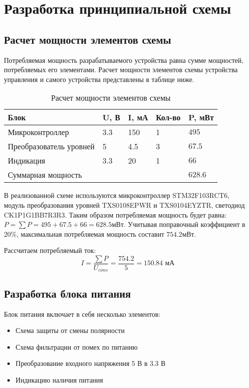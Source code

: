 \section{Разработка принципиальной схемы}
\label{sec:principal}

\subsection{Расчет мощности элементов схемы}
Потребляемая мощность разрабатываемого устройства равна сумме мощностей, потребляемых его элементами. Расчет мощности элементов схемы устройства управления и самого устройства представлены в таблице ниже.

\begin{table}[ht]
    \caption{Расчет мощности элементов схемы}
    \label{table:power_calc}
    \begin{tabular}{|llll|l|}
        \hline
        \multicolumn{1}{|l|}{Блок}                    & \multicolumn{1}{l|}{U, В} & \multicolumn{1}{l|}{I, мА} & Кол-во & P, мВт  \\ \hline
        \multicolumn{1}{|l|}{Микроконтроллер}         & \multicolumn{1}{l|}{3.3}  & \multicolumn{1}{l|}{150}   & 1      & $495$   \\ \hline
        \multicolumn{1}{|l|}{Преобразователь уровней} & \multicolumn{1}{l|}{5}    & \multicolumn{1}{l|}{4.5}   & 3      & $67.5$  \\ \hline
        \multicolumn{1}{|l|}{Индикация}               & \multicolumn{1}{l|}{3.3}  & \multicolumn{1}{l|}{20}    & 1      & $66$    \\ \hline
        \multicolumn{4}{|l|}{Суммарная мощность}                                                                        & $628.6$ \\ \hline
    \end{tabular}
\end{table}

В реализованной схеме используются микроконтроллер STM32F103RCT6, модуль преобразования уровней TXS0108EPWR и TXS0104EYZTR, светодиод CK1P1G1BB7R3R3. Таким образом потребляемая мощность будет равна: \(P = \sum P = 495 + 67.5 + 66 = 628.5\)мВт. Учитывая поправочный коэффициент в 20\%, максимальная потребляемая мощность составит \(754.2 мВт\).

Рассчитаем потребляемый ток:
\[I=\frac{\sum P}{U_{cons}}=\frac{754.2}{5}=150.84\text{ мА}\]

\subsection{Разработка блока питания}
Блок питания включает в себя несколько элементов:
\begin{itemize}
    \item Схема защиты от смены полярности
    \item Схема фильтрации от помех по питанию
    \item Преобразование входного напряжения 5 В в 3.3 В
    \item Индикацию наличия питания
\end{itemize}


